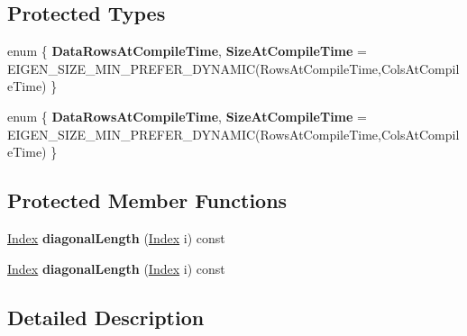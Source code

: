 \subsection*{Protected Types}
\begin{DoxyCompactItemize}
\item 
\mbox{\label{class_eigen_1_1internal_1_1_band_matrix_base_a9d48a6fae4c14f5aced793b19298bd8b}} 
enum \{ {\bfseries Data\+Rows\+At\+Compile\+Time}, 
{\bfseries Size\+At\+Compile\+Time} = E\+I\+G\+E\+N\+\_\+\+S\+I\+Z\+E\+\_\+\+M\+I\+N\+\_\+\+P\+R\+E\+F\+E\+R\+\_\+\+D\+Y\+N\+A\+M\+IC(Rows\+At\+Compile\+Time,Cols\+At\+Compile\+Time)
 \}
\item 
\mbox{\label{class_eigen_1_1internal_1_1_band_matrix_base_a4d73c0123751a921bcda0db0f3e1ce38}} 
enum \{ {\bfseries Data\+Rows\+At\+Compile\+Time}, 
{\bfseries Size\+At\+Compile\+Time} = E\+I\+G\+E\+N\+\_\+\+S\+I\+Z\+E\+\_\+\+M\+I\+N\+\_\+\+P\+R\+E\+F\+E\+R\+\_\+\+D\+Y\+N\+A\+M\+IC(Rows\+At\+Compile\+Time,Cols\+At\+Compile\+Time)
 \}
\end{DoxyCompactItemize}
\subsection*{Protected Member Functions}
\begin{DoxyCompactItemize}
\item 
\mbox{\label{class_eigen_1_1internal_1_1_band_matrix_base_a591e1a809bd6957740356a962f922626}} 
\hyperlink{group___core___module_a554f30542cc2316add4b1ea0a492ff02}{Index} {\bfseries diagonal\+Length} (\hyperlink{group___core___module_a554f30542cc2316add4b1ea0a492ff02}{Index} i) const
\item 
\mbox{\label{class_eigen_1_1internal_1_1_band_matrix_base_a591e1a809bd6957740356a962f922626}} 
\hyperlink{group___core___module_a554f30542cc2316add4b1ea0a492ff02}{Index} {\bfseries diagonal\+Length} (\hyperlink{group___core___module_a554f30542cc2316add4b1ea0a492ff02}{Index} i) const
\end{DoxyCompactItemize}


\subsection{Detailed Description}
